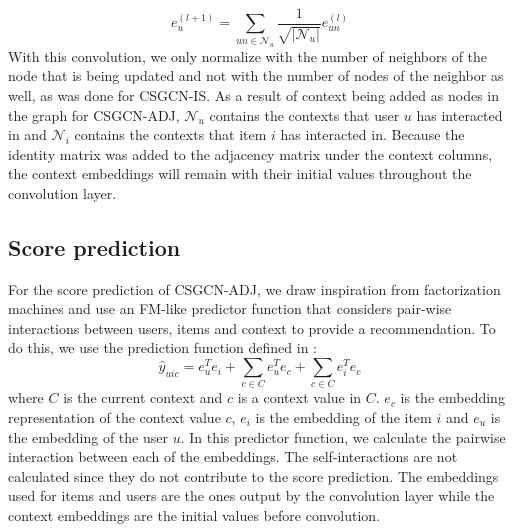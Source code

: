 \begin{equation}\label{eq:csgcn_adj_gc_layer_user}
     e_{u}^{(l+1)}=\sum_{un\in \mathcal{N}_{u}}\frac{1}{ \sqrt{|\mathcal{N}_{u}|}}e_{un}^{(l)}
\end{equation}
With this convolution, we only normalize with the number of neighbors of the node that is being updated and not with the number of nodes of the neighbor as well, as was done for CSGCN-IS.
As a result of context being added as nodes in the graph for CSGCN-ADJ, $\mathcal{N}_{u}$ contains the contexts that user $u$ has interacted in and $\mathcal{N}_{i}$ contains the contexts that item $i$ has interacted in.
Because the identity matrix was added to the adjacency matrix under the context columns, the context embeddings will remain with their initial values throughout the convolution layer.

\subsection{Score prediction}\label{subsec:csgcn_adj_score_pred}
For the score prediction of CSGCN-ADJ, we draw inspiration from factorization machines and use an FM-like predictor function that considers pair-wise interactions between users, items and context to provide a recommendation.
To do this, we use the prediction function defined in :
\begin{equation}\label{eq:csgcn_adj_scorepred}
    \hat{y}_{uic} = e_u^Te_i + \sum_{c \in C}e_u^Te_{c} + \sum_{c \in C}e_i^Te_{c}
\end{equation}
where $C$ is the current context and $c$ is a context value in $C$.
$e_{c}$ is the embedding representation of the context value $c$, $e_i$ is the embedding of the item $i$ and $e_u$ is the embedding of the user $u$.
In this predictor function, we calculate the pairwise interaction between each of the embeddings. The self-interactions are not calculated since they do not contribute to the score prediction. The embeddings used for items and users are the ones output by the convolution layer while the context embeddings are the initial values before convolution.

